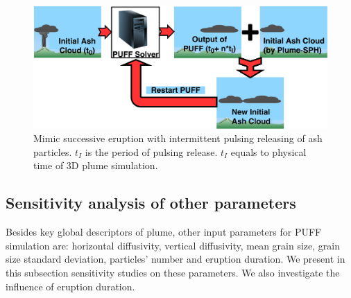 \begin{figure}
\center
\includegraphics[width=0.90 \textwidth]{Chapter-7/Figures/Restart-PUFF.pdf} 
    \caption{Mimic successive eruption with intermittent pulsing releasing of ash particles. $t_I$ is the period of pulsing release. $t_I$ equals to physical time of 3D plume simulation.}
    \label{fig:Restart-Puff}
\end{figure}

\subsection{Sensitivity analysis of other parameters}

Besides key global descriptors of plume, other input parameters for PUFF simulation are: horizontal diffusivity, vertical diffusivity, mean grain size, grain size standard deviation, particles' number and eruption duration. We present in this subsection sensitivity studies on these parameters. We also investigate the influence of eruption duration.

